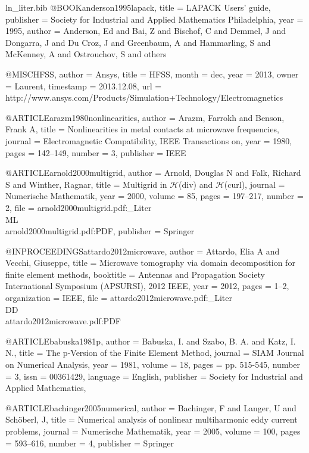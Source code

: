 \begin{filecontents*}{ln_liter.bib}
@BOOK{anderson1995lapack,
  title = {LAPACK Users' guide},
  publisher = {Society for Industrial and Applied Mathematics Philadelphia},
  year = {1995},
  author = {Anderson, Ed and Bai, Z and Bischof, C and Demmel, J and Dongarra,
	J and Du Croz, J and Greenbaum, A and Hammarling, S and McKenney,
	A and Ostrouchov, S and others}
}

@MISC{HFSS,
  author = {{Ansys}},
  title = {{HFSS}},
  month = dec,
  year = {2013},
  owner = {Laurent},
  timestamp = {2013.12.08},
  url = {http://www.ansys.com/Products/Simulation+Technology/Electromagnetics}
}

@ARTICLE{arazm1980nonlinearities,
  author = {Arazm, Farrokh and Benson, Frank A},
  title = {Nonlinearities in metal contacts at microwave frequencies},
  journal = {Electromagnetic Compatibility, IEEE Transactions on},
  year = {1980},
  pages = {142--149},
  number = {3},
  publisher = {IEEE}
}

@ARTICLE{arnold2000multigrid,
  author = {Arnold, Douglas N and Falk, Richard S and Winther, Ragnar},
  title = {Multigrid in $\mathcal{H}$(div) and $\mathcal{H}$(curl)},
  journal = {Numerische Mathematik},
  year = {2000},
  volume = {85},
  pages = {197--217},
  number = {2},
  file = {arnold2000multigrid.pdf:_Liter\\ML\\arnold2000multigrid.pdf:PDF},
  publisher = {Springer}
}

@INPROCEEDINGS{attardo2012microwave,
  author = {Attardo, Elia A and Vecchi, Giuseppe},
  title = {Microwave tomography via domain decomposition for finite element
	methods},
  booktitle = {Antennas and Propagation Society International Symposium (APSURSI),
	2012 IEEE},
  year = {2012},
  pages = {1--2},
  organization = {IEEE},
  file = {attardo2012microwave.pdf:_Liter\\DD\\attardo2012microwave.pdf:PDF}
}

@ARTICLE{babuska1981p,
  author = {Babuska, I. and Szabo, B. A. and Katz, I. N.},
  title = {The p-Version of the Finite Element Method},
  journal = {SIAM Journal on Numerical Analysis},
  year = {1981},
  volume = {18},
  pages = {pp. 515-545},
  number = {3},
  issn = {00361429},
  language = {English},
  publisher = {Society for Industrial and Applied Mathematics},
}

@ARTICLE{bachinger2005numerical,
  author = {Bachinger, F and Langer, U and Sch{\"o}berl, J},
  title = {Numerical analysis of nonlinear multiharmonic eddy current problems},
  journal = {Numerische Mathematik},
  year = {2005},
  volume = {100},
  pages = {593--616},
  number = {4},
  publisher = {Springer}
}


\end{filecontents*}
